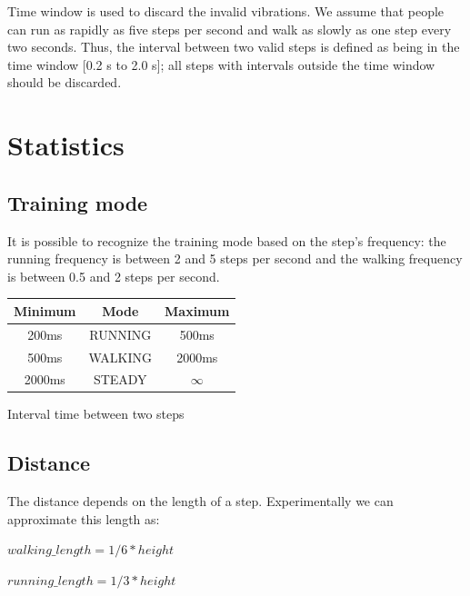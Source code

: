 \documentclass[a4paper,10pt]{article}
\makeatletter
\newenvironment{tablehere}{\def\@captype{table}\vspace{2ex}}{\vspace{1ex}}
\makeatother
\begin{document}
\begin{multicols}{2}
Time window is used to discard the invalid vibrations. We assume that people can run as rapidly as five steps per second and walk as slowly as one step every two seconds. Thus, the interval between two valid steps is defined as being in the time window [0.2 s to 2.0 s]; all steps with intervals outside the time window should be discarded.

\section{Statistics}

\subsection{Training mode}

It is possible to recognize the training mode based on the step's frequency: the running frequency is between 2 and 5 steps per second and the walking frequency is between 0.5 and 2 steps per second. 

\begin{tablehere}
\centering
\begin{tabular}{|c|c|c|} \hline
{\bf Minimum} & {\bf Mode} & {\bf Maximum}\\ \hline
200ms & RUNNING & 500ms \\
500ms & WALKING & 2000ms \\
2000ms & STEADY & $\infty$ \\  \hline
\end{tabular}
\caption{Interval time between two steps}
\end{tablehere}



\subsection{Distance}

The distance depends on the length of a step. Experimentally we can approximate this length as: \\

\centerline{$walking \_ length = 1/6 * height$}
\centerline{$running \_ length = 1/3 * height$}


\end{multicols}
\end{document}
